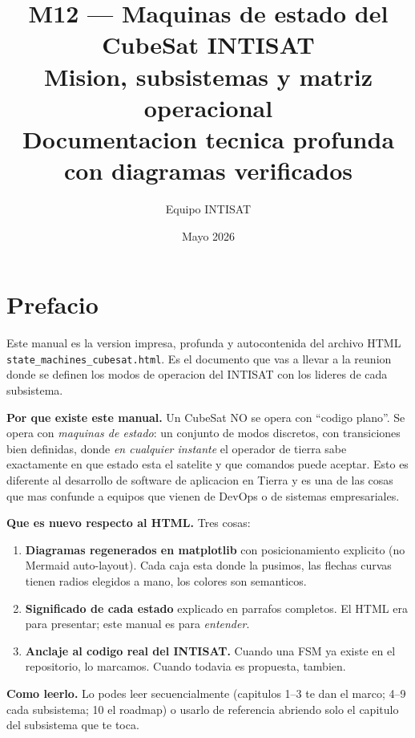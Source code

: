 \documentclass[11pt,a4paper,oneside,openright]{book}
\title{\Huge\bfseries M12 --- Maquinas de estado del CubeSat INTISAT\\[0.5em]
  \large Mision, subsistemas y matriz operacional\\
  \normalsize Documentacion tecnica profunda con diagramas verificados}
\author{Equipo INTISAT}
\date{Mayo 2026}
\begin{document}
\frontmatter
\maketitle

\chapter*{Prefacio}

Este manual es la version impresa, profunda y autocontenida del archivo
HTML \texttt{state\_machines\_cubesat.html}. Es el documento que vas
a llevar a la reunion donde se definen los modos de operacion del
INTISAT con los lideres de cada subsistema.

\textbf{Por que existe este manual.} Un CubeSat NO se opera con
``codigo plano''. Se opera con \emph{maquinas de estado}: un conjunto
de modos discretos, con transiciones bien definidas, donde
\emph{en cualquier instante} el operador de tierra sabe exactamente
en que estado esta el satelite y que comandos puede aceptar. Esto es
diferente al desarrollo de software de aplicacion en Tierra y es una
de las cosas que mas confunde a equipos que vienen de DevOps o de
sistemas empresariales.

\textbf{Que es nuevo respecto al HTML.} Tres cosas:

\begin{enumerate}[leftmargin=2em]
  \item \textbf{Diagramas regenerados en matplotlib} con
    posicionamiento explicito (no Mermaid auto-layout). Cada caja
    esta donde la pusimos, las flechas curvas tienen radios elegidos
    a mano, los colores son semanticos.
  \item \textbf{Significado de cada estado} explicado en parrafos
    completos. El HTML era para presentar; este manual es para
    \emph{entender}.
  \item \textbf{Anclaje al codigo real del INTISAT.} Cuando una FSM
    ya existe en el repositorio, lo marcamos. Cuando todavia es
    propuesta, tambien.
\end{enumerate}

\textbf{Como leerlo.} Lo podes leer secuencialmente (capitulos 1--3
te dan el marco; 4--9 cada subsistema; 10 el roadmap) o usarlo de
referencia abriendo solo el capitulo del subsistema que te toca.

\tableofcontents

\mainmatter

\end{document}
